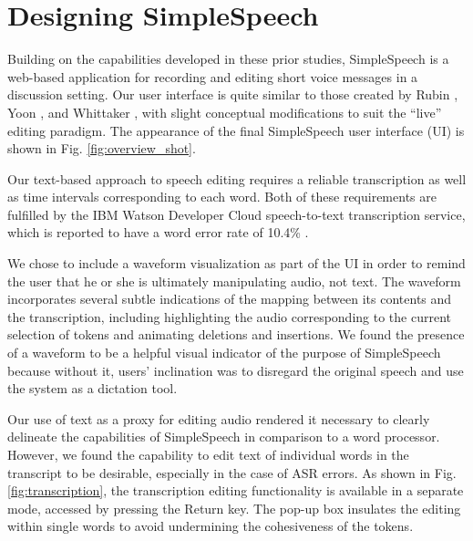 \section{Designing SimpleSpeech}
Building on the capabilities developed in these prior studies, SimpleSpeech is a web-based application for recording and editing short voice messages in a discussion setting.
Our user interface is quite similar to those created by Rubin \cite{rubin}, Yoon \cite{yoon}, and Whittaker \cite{whittaker_semantic}, with slight conceptual modifications to suit the ``live'' editing paradigm.
The appearance of the final SimpleSpeech user interface (UI) is shown in Fig. \ref{fig:overview_shot}.

Our text-based approach to speech editing requires a reliable transcription as well as time intervals corresponding to each word.
Both of these requirements are fulfilled by the IBM Watson Developer Cloud speech-to-text transcription service, which is reported to have a word error rate of 10.4\% \cite{soltau:2014}.

We chose to include a waveform visualization as part of the UI in order to remind the user that he or she is ultimately manipulating audio, not text. 
The waveform incorporates several subtle indications of the mapping between its contents and the transcription, including highlighting the audio corresponding to the current selection of tokens and animating deletions and insertions.
We found the presence of a waveform to be a helpful visual indicator of the purpose of SimpleSpeech because without it, users' inclination was to disregard the original speech and use the system as a dictation tool.

Our use of text as a proxy for editing audio rendered it necessary to clearly delineate the capabilities of SimpleSpeech in comparison to a word processor.
However, we found the capability to edit text of individual words in the transcript to be desirable, especially in the case of ASR errors.
As shown in Fig. \ref{fig:transcription}, the transcription editing functionality is available in a separate mode, accessed by pressing the Return key.
The pop-up box insulates the editing within single words to avoid undermining the cohesiveness of the tokens. 

